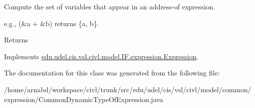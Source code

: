 Compute the set of variables that appear in an address-\/of expression. 

e.\+g., {\ttfamily (\&a + \&b)} returns {\ttfamily \{a, b\}}.

\begin{DoxyReturn}{Returns}

\end{DoxyReturn}


Implements \hyperlink{interfaceedu_1_1udel_1_1cis_1_1vsl_1_1civl_1_1model_1_1IF_1_1expression_1_1Expression_ac2ad0236534bec54b91ee78ff658cbe0}{edu.\+udel.\+cis.\+vsl.\+civl.\+model.\+I\+F.\+expression.\+Expression}.



The documentation for this class was generated from the following file\+:\begin{DoxyCompactItemize}
\item 
/home/arnabd/workspace/civl/trunk/src/edu/udel/cis/vsl/civl/model/common/expression/Common\+Dynamic\+Type\+Of\+Expression.\+java\end{DoxyCompactItemize}
